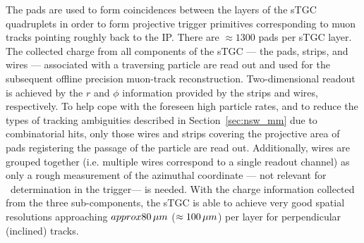 The pads are used to form coincidences between the layers of the sTGC quadruplets in order
to form projective trigger primitives corresponding to muon tracks pointing roughly back to the IP.
There are $\approx 1300$ pads per sTGC layer.
The collected charge from all components of the sTGC --- the pads, strips, and wires --- associated with a traversing particle are read out and
used for the subsequent offline precision muon-track reconstruction.
Two-dimensional readout is achieved by the $r$ and $\phi$ information provided by the strips
and wires, respectively.
To help cope with the foreseen high particle rates, and to reduce the types of tracking ambiguities
described in Section~\ref{sec:nsw_mm} due to combinatorial hits, only
those wires and strips covering the projective area of pads registering the passage of
the particle are read out.
Additionally, wires are grouped together (i.e. multiple wires correspond to a single readout
channel) as only a rough measurement of the azimuthal coordinate --- not relevant for \pT~determination in the trigger---
is needed.
With the charge information collected from the three sub-components, the sTGC is able to achieve very
good spatial resolutions approaching $approx 80\,\mu m$ ($\approx 100\,\mu m$) per layer for perpendicular (inclined) tracks.

